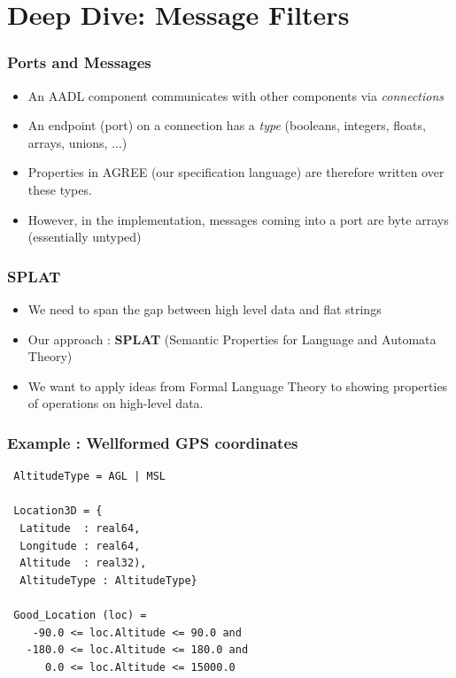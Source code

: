 \documentclass{beamer}
\begin{document}
\section {Deep Dive: Message Filters}

\begin{frame}\frametitle{Ports and Messages}

\begin{itemize}

  \item An AADL component communicates with other components via \emph{connections}

\item  An endpoint (port) on a connection has a \emph{type} (booleans,
  integers, floats, arrays, unions, ...)

\item Properties in AGREE (our specification language) are therefore written over these types.

\item However, in the implementation, messages coming into a port are
  byte arrays (essentially untyped)

\end{itemize}

\end{frame}

\begin{frame}\frametitle{SPLAT}

\begin{itemize}

\item We need to span the gap between high level data and flat strings

\item Our approach : \textbf{SPLAT} (Semantic Properties for Language and Automata Theory)

\item We want to apply ideas from Formal Language Theory to showing
  properties of operations on high-level data.

\end{itemize}

\end{frame}


\begin{frame}[fragile]\frametitle{Example : Wellformed GPS coordinates}

{\small
\begin{verbatim}
 AltitudeType = AGL | MSL

 Location3D = {
  Latitude  : real64,
  Longitude : real64,
  Altitude  : real32),
  AltitudeType : AltitudeType}

 Good_Location (loc) =
    -90.0 <= loc.Altitude <= 90.0 and
   -180.0 <= loc.Altitude <= 180.0 and
      0.0 <= loc.Altitude <= 15000.0
\end{verbatim}
}

\end{frame}
\end{document}
